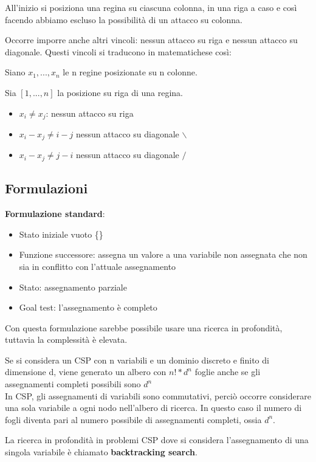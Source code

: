 All'inizio si posiziona una regina su ciascuna colonna, in una riga a caso e
così facendo abbiamo escluso la possibilità di un attacco su colonna.

Occorre imporre anche altri vincoli: nessun attacco su riga e nessun attacco su
diagonale. Questi vincoli si traducono in matematichese così:

Siano $x_1,...,x_n$ le n regine posizionate su n colonne.

Sia $[1,...,n]$ la posizione su riga di una regina.

\begin{itemize}
 \item $x_i \neq x_j$: nessun attacco su riga
 \item $x_i - x_j \neq i-j$ nessun attacco su diagonale $\backslash$
 \item $x_i - x_j \neq j-i$ nessun attacco su diagonale $/$
\end{itemize}

\subsection{Formulazioni}

\textbf{Formulazione standard}:

\begin{itemize}
 \item Stato iniziale vuoto \{\}
 \item Funzione successore: assegna un valore a una variabile non assegnata
che non sia in conflitto con l'attuale assegnamento
 \item Stato: assegnamento parziale
 \item Goal test: l'assegnamento è completo
\end{itemize}

Con questa formulazione sarebbe possibile usare una ricerca in profondità, tuttavia
la complessità è elevata.

Se si considera un CSP con n variabili e un dominio discreto e finito di
dimensione d, viene generato un albero con $n!*d^n$ foglie anche se gli
assegnamenti completi possibili sono $d^n$\\

In CSP, gli assegnamenti di variabili sono commutativi, perciò occorre
considerare una sola variabile a ogni nodo nell'albero di ricerca.
In questo caso il numero di fogli diventa pari al numero possibile di
assegnamenti completi, ossia $d^n$.

La ricerca in profondità in problemi CSP dove si considera l'assegnamento
di una singola variabile è chiamato \textbf{backtracking search}.

